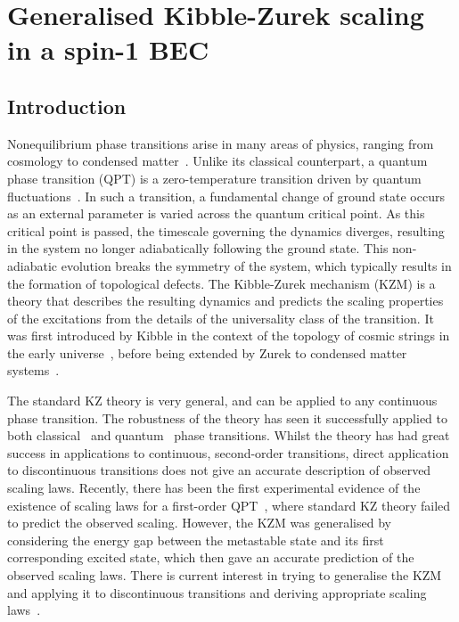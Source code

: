 \chapter{Generalised Kibble-Zurek scaling in a spin-1 BEC}\label{chap: spin-1}


\section{Introduction}
Nonequilibrium phase transitions arise in many areas of physics, ranging from
cosmology to condensed matter~\cite{Polkovnikov2011}.
Unlike its classical counterpart, a quantum phase transition (QPT) is a
zero-temperature transition driven by quantum fluctuations~\cite{Sachdev2011}.
In such a transition, a fundamental change of ground state occurs as an external
parameter is varied across the quantum critical point.
As this critical point is passed, the timescale governing the dynamics diverges,
resulting in the system no longer adiabatically following the ground state.
This non-adiabatic evolution breaks the symmetry of the system, which typically
results in the formation of topological defects.
The Kibble-Zurek mechanism (KZM) is a theory that describes the resulting
dynamics and predicts the scaling properties of the excitations from the details
of the universality class of the transition.
It was first introduced by Kibble in the context of the topology of cosmic
strings in the early universe~\cite{Kibble1976, Kibble1980}, before being
extended by Zurek to condensed matter systems~\cite{Zurek1985, Zurek1993,
Zurek1996}.


The standard KZ theory is very general, and can be applied to any continuous
phase transition.
The robustness of the theory has seen it successfully applied to both
classical~\cite{Donadello2016,Beugnon2017} and
quantum~\cite{Dziarmaga2005, Damski2005, Lamacraft2007} phase transitions.
Whilst the theory has had great success in applications to continuous,
second-order transitions, direct application to discontinuous transitions
does not give an accurate description of observed scaling laws.
Recently, there has been the first experimental evidence of the existence of
scaling laws for a first-order QPT~\cite{Qiu2020}, where standard KZ theory
failed to predict the observed scaling.
However, the KZM was generalised by considering the energy gap between the
metastable state and its first corresponding excited state, which then gave an
accurate prediction of the observed scaling laws.
There is current interest in trying to generalise the KZM and applying it to
discontinuous transitions and deriving appropriate scaling
laws~\cite{Divakaran2008, Suzuki2015}.

